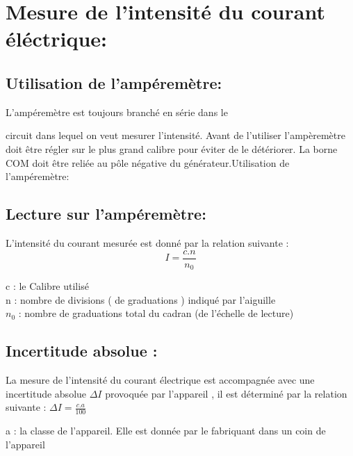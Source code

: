 \documentclass[12pt]{article}
\begin{document}
\section{Mesure de l'intensité du courant éléctrique:} 
\subsection{Utilisation de l'ampéremètre:}
L'ampéremètre est toujours branché en série dans le

circuit dans lequel on veut mesurer l'intensité.
Avant de l'utiliser l'ampèremètre doit être régler sur le plus grand calibre pour éviter de le détériorer.
La borne COM doit être reliée au pôle négative du générateur.Utilisation de l'ampéremètre:
\subsection{Lecture sur l'ampéremètre:}
L’intensité du courant mesurée est donné par la relation suivante :
$$I=\frac{c.n}{n_0}$$

c : le Calibre utilisé
\\n : nombre de divisions ( de graduations ) indiqué par l’aiguille
\\$n_0$ : nombre de graduations total du cadran (de l’échelle de lecture)

\subsection{Incertitude absolue :}
La mesure de l’intensité du courant électrique est accompagnée avec une
incertitude absolue $\Delta{I}$ provoquée par l’appareil , il est déterminé par la
relation suivante : $\Delta{I} = \frac{c.a}{100}$

a : la classe de l’appareil. Elle est donnée par le fabriquant dans un coin de l’appareil
\end{document}
